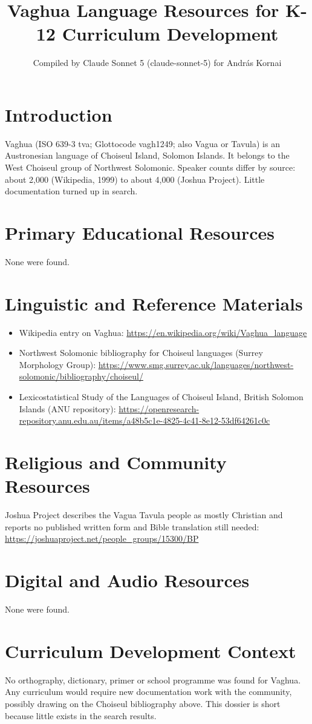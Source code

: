 \documentclass[12pt]{article}
\title{Vaghua Language Resources for K-12 Curriculum Development}
\author{Compiled by Claude Sonnet 5 (claude-sonnet-5) for Andr\'as Kornai}
\date{}
\begin{document}
\maketitle

\section{Introduction}
Vaghua (ISO 639-3 tva; Glottocode vagh1249; also Vagua or Tavula) is an Austronesian language of Choiseul Island, Solomon Islands. It belongs to the West Choiseul group of Northwest Solomonic. Speaker counts differ by source: about 2,000 (Wikipedia, 1999) to about 4,000 (Joshua Project). Little documentation turned up in search.

\section{Primary Educational Resources}
None were found.

\section{Linguistic and Reference Materials}
\begin{itemize}
\item Wikipedia entry on Vaghua: \url{https://en.wikipedia.org/wiki/Vaghua_language}
\item Northwest Solomonic bibliography for Choiseul languages (Surrey Morphology Group): \url{https://www.smg.surrey.ac.uk/languages/northwest-solomonic/bibliography/choiseul/}
\item Lexicostatistical Study of the Languages of Choiseul Island, British Solomon Islands (ANU repository): \url{https://openresearch-repository.anu.edu.au/items/a48b5c1e-4825-4c41-8e12-53df64261c0c}
\end{itemize}

\section{Religious and Community Resources}
Joshua Project describes the Vagua Tavula people as mostly Christian and reports no published written form and Bible translation still needed: \url{https://joshuaproject.net/people_groups/15300/BP}

\section{Digital and Audio Resources}
None were found.

\section{Curriculum Development Context}
No orthography, dictionary, primer or school programme was found for Vaghua. Any curriculum would require new documentation work with the community, possibly drawing on the Choiseul bibliography above. This dossier is short because little exists in the search results.
\end{document}
